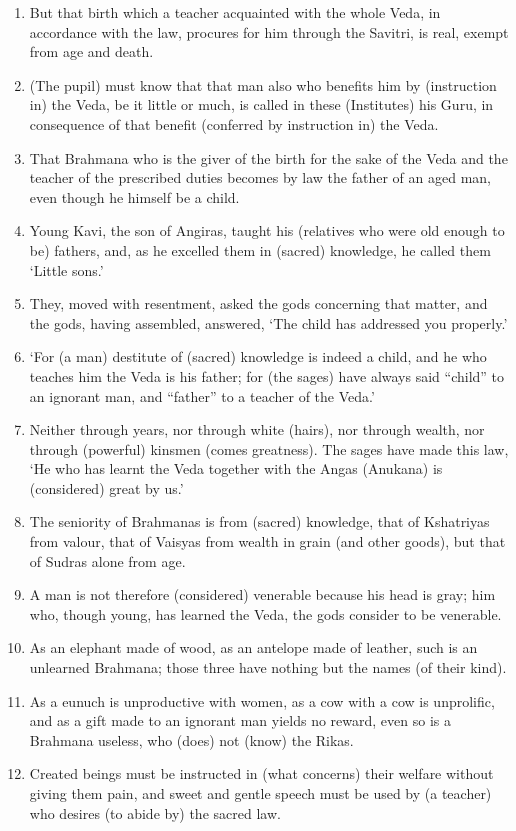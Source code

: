\begin{enumerate}
\item But that birth which a teacher acquainted with the whole Veda, in accordance with the law, procures for him through the Savitri, is real, exempt from age and death.
\item (The pupil) must know that that man also who benefits him by (instruction in) the Veda, be it little or much, is called in these (Institutes) his Guru, in consequence of that benefit (conferred by instruction in) the Veda.
\item That Brahmana who is the giver of the birth for the sake of the Veda and the teacher of the prescribed duties becomes by law the father of an aged man, even though he himself be a child.
\item Young Kavi, the son of Angiras, taught his (relatives who were old enough to be) fathers, and, as he excelled them in (sacred) knowledge, he called them `Little sons.'
\item They, moved with resentment, asked the gods concerning that matter, and the gods, having assembled, answered, `The child has addressed you properly.'
\item `For (a man) destitute of (sacred) knowledge is indeed a child, and he who teaches him the Veda is his father; for (the sages) have always said ``child'' to an ignorant man, and ``father'' to a teacher of the Veda.'
\item Neither through years, nor through white (hairs), nor through wealth, nor through (powerful) kinsmen (comes greatness). The sages have made this law, `He who has learnt the Veda together with the Angas (Anukana) is (considered) great by us.'
\item The seniority of Brahmanas is from (sacred) knowledge, that of Kshatriyas from valour, that of Vaisyas from wealth in grain (and other goods), but that of Sudras alone from age.
\item A man is not therefore (considered) venerable because his head is gray; him who, though young, has learned the Veda, the gods consider to be venerable.
\item As an elephant made of wood, as an antelope made of leather, such is an unlearned Brahmana; those three have nothing but the names (of their kind).
\item As a eunuch is unproductive with women, as a cow with a cow is unprolific, and as a gift made to an ignorant man yields no reward, even so is a Brahmana useless, who (does) not (know) the Rikas.
\item Created beings must be instructed in (what concerns) their welfare without giving them pain, and sweet and gentle speech must be used by (a teacher) who desires (to abide by) the sacred law.

\end{enumerate}
